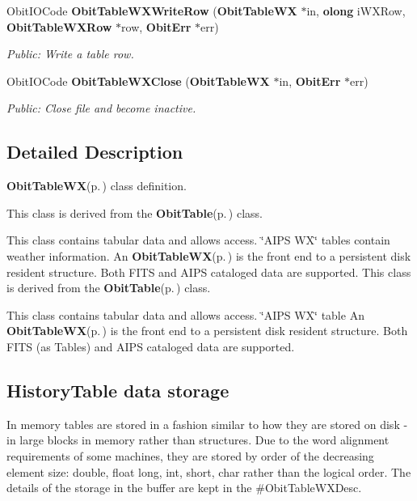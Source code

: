 \begin{CompactItemize}
Obit\-IOCode {\bf Obit\-Table\-WXWrite\-Row} ({\bf Obit\-Table\-WX} $\ast$in, {\bf olong} i\-WXRow, {\bf Obit\-Table\-WXRow} $\ast$row, {\bf Obit\-Err} $\ast$err)
\begin{CompactList}\small\item\em Public: Write a table row. \item\end{CompactList}\item 
Obit\-IOCode {\bf Obit\-Table\-WXClose} ({\bf Obit\-Table\-WX} $\ast$in, {\bf Obit\-Err} $\ast$err)
\begin{CompactList}\small\item\em Public: Close file and become inactive. \item\end{CompactList}\end{CompactItemize}


\subsection{Detailed Description}
{\bf Obit\-Table\-WX}{\rm (p.\,\pageref{structObitTableWX})} class definition. 

This class is derived from the {\bf Obit\-Table}{\rm (p.\,\pageref{structObitTable})} class.

This class contains tabular data and allows access. \char`\"{}AIPS WX\char`\"{} tables contain weather information. An {\bf Obit\-Table\-WX}{\rm (p.\,\pageref{structObitTableWX})} is the front end to a persistent disk resident structure. Both FITS and AIPS cataloged data are supported. This class is derived from the {\bf Obit\-Table}{\rm (p.\,\pageref{structObitTable})} class.

This class contains tabular data and allows access. \char`\"{}AIPS WX\char`\"{} table An {\bf Obit\-Table\-WX}{\rm (p.\,\pageref{structObitTableWX})} is the front end to a persistent disk resident structure. Both FITS (as Tables) and AIPS cataloged data are supported.\subsection{History\-Table data storage}\label{ObitTableWX_8h_TableDataStorage}
In memory tables are stored in a fashion similar to how they are stored on disk - in large blocks in memory rather than structures. Due to the word alignment requirements of some machines, they are stored by order of the decreasing element size: double, float long, int, short, char rather than the logical order. The details of the storage in the buffer are kept in the \#Obit\-Table\-WXDesc.

